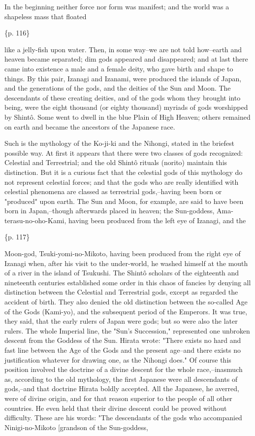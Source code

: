 In the beginning neither force nor form was manifest; and the world was a shapeless mass that floated

\{p. 116\}

like a jelly-fish upon water. Then, in some way--we are not told how--earth and heaven became separated; dim gods appeared and disappeared; and at last there came into existence a male and a female deity, who gave birth and shape to things. By this pair, Izanagi and Izanami, were produced the islands of Japan, and the generations of the gods, and the deities of the Sun and Moon. The descendants of these creating deities, and of the gods whom they brought into being, were the eight thousand (or eighty thousand) myriads of gods worshipped by Shintô. Some went to dwell in the blue Plain of High Heaven; others remained on earth and became the ancestors of the Japanese race.

Such is the mythology of the Ko-ji-ki and the Nihongi, stated in the briefest possible way. At first it appears that there were two classes of gods recognized: Celestial and Terrestrial; and the old Shintô rituals (norito) maintain this distinction. But it is a curious fact that the celestial gods of this mythology do not represent celestial forces; and that the gods who are really identified with celestial phenomena are classed as terrestrial gods,--having been born or "produced" upon earth. The Sun and Moon, for example, are said to have been born in Japan,--though afterwards placed in heaven; the Sun-goddess, Ama-terasu-no-oho-Kami, having been produced from the left eye of Izanagi, and the

\{p. 117\}

Moon-god, Tsuki-yomi-no-Mikoto, having been produced from the right eye of Izanagi when, after his visit to the under-world, he washed himself at the mouth of a river in the island of Tsukushi. The Shintô scholars of the eighteenth and nineteenth centuries established some order in this chaos of fancies by denying all distinction between the Celestial and Terrestrial gods, except as regarded the accident of birth. They also denied the old distinction between the so-called Age of the Gods (Kami-yo), and the subsequent period of the Emperors. It was true, they said, that the early rulers of Japan were gods; but so were also the later rulers. The whole Imperial line, the "Sun's Succession," represented one unbroken descent from the Goddess of the Sun. Hirata wrote: "There exists no hard and fast line between the Age of the Gods and the present age--and there exists no justification whatever for drawing one, as the Nihongi does." Of course this position involved the doctrine of a divine descent for the whole race,--inasmuch as, according to the old mythology, the first Japanese were all descendants of gods,--and that doctrine Hirata boldly accepted. All the Japanese, he averred, were of divine origin, and for that reason superior to the people of all other countries. He even held that their divine descent could be proved without difficulty. These are his words: "The descendants of the gods who accompanied Ninigi-no-Mikoto [grandson of the Sun-goddess,

